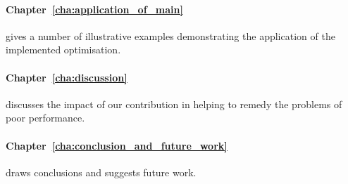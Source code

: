\paragraph{Chapter~\ref{cha:application_of_main}} gives a number of illustrative examples demonstrating the application of the implemented optimisation.


\paragraph{Chapter~\ref{cha:discussion}} discusses the impact of our contribution in helping to remedy the problems of poor performance.

\paragraph{Chapter~\ref{cha:conclusion_and_future_work}} draws conclusions and suggests future work.


